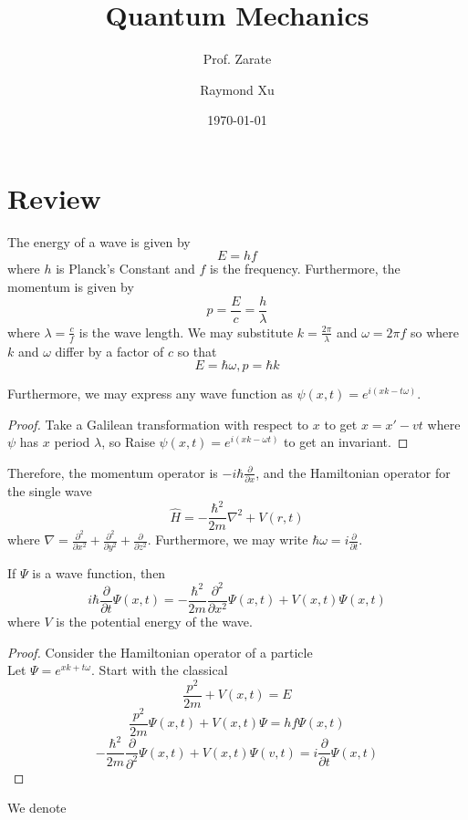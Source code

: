 \documentclass[11pt]{scrartcl}
\begin{document}
\title{Quantum Mechanics}
\subtitle{Prof. Zarate}
\author{Raymond Xu}
\date{\today}
\maketitle



\section{Review}

\begin{theorem}
    The energy of a wave is given by \[E = h f\] where $h$ is Planck's Constant and $f$ is the frequency. Furthermore, the momentum is given by \[p = \frac{E}{c} = \frac{h}{\lambda}\] where $\lambda = \frac{c}{f}$ is the wave length. We may substitute $k = \frac{2\pi}{\lambda}$ and $\omega = 2\pi f$ so where $k$ and $\omega$ differ by a factor of $c$ so that \[E = \hbar \omega, p = \hbar k\] 
\end{theorem}

Furthermore, we may express any wave function as $\psi(x,t) = e^{i(xk-t\omega)}$. 

\begin{proof}
    Take a Galilean transformation with respect to $x$ to get $x = x' - vt$ where $\psi$ has $x$ period $\lambda$, so Raise $\psi(x,t) = e^{i(xk - \omega t)}$ to get an invariant. 
\end{proof}

Therefore, the momentum operator is $-i \hbar \frac{\partial}{\partial x}$, and the Hamiltonian operator for the single wave \[\hat{H} = -\frac{\hbar^2}{2m} \nabla^2 + V(r,t)\] where $\nabla = \frac{\partial^2}{\partial x^2} + \frac{\partial^2}{\partial y^2} + \frac{\partial}{\partial z^2}$. Furthermore, we may write $\hbar \omega = i \frac{\partial}{\partial t}$.

\begin{theorem}
    If $\Psi$ is a wave function, then \[i \hbar \frac{\partial }{\partial t} \Psi(x,t) = -\frac{\hbar^2}{2m} \frac{\partial^2}{\partial x^2}\Psi(x,t) + V(x,t) \Psi(x,t)\] where $V$ is the potential energy of the wave. 
\end{theorem}

\begin{proof}
    Consider the Hamiltonian operator of a particle \[\]
    Let $\Psi = e^{xk + t\omega}$. Start with the classical \[\frac{p^2}{2m} + V(x,t) = E\] \[\frac{p^2}{2m} \Psi(x,t) + V(x,t) \Psi = hf \Psi(x,t)\] \[-\frac{\hbar^2}{2m} \frac{\partial}{\partial^2} \Psi(x,t) + V(x,t)\Psi(v,t) = i\frac{\partial}{\partial t} \Psi(x,t)\]
\end{proof}

\begin{definition}
    We denote   
\end{definition}
\end{document}
